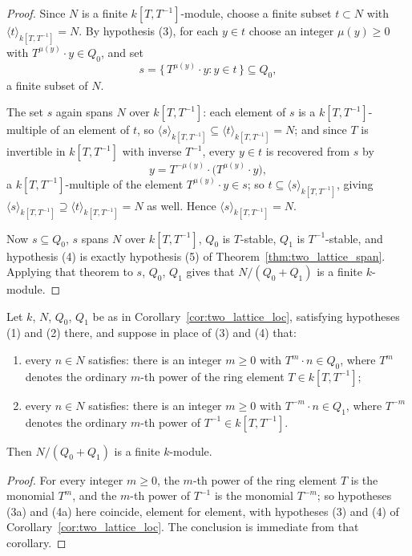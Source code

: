 \begin{proof}
  \leanok
  Since \(N\) is a finite \(k[T,T^{-1}]\)-module, choose a finite subset \(t \subset N\) with
  \(\langle t \rangle_{k[T,T^{-1}]} = N\). By hypothesis (3), for each \(y \in t\) choose an
  integer \(\mu(y) \ge 0\) with \(T^{\mu(y)} \cdot y \in Q_0\), and set
  \[
    s = \{\, T^{\mu(y)} \cdot y : y \in t \,\} \subseteq Q_0 ,
  \]
  a finite subset of \(N\).

  The set \(s\) again spans \(N\) over \(k[T,T^{-1}]\): each element of \(s\) is a
  \(k[T,T^{-1}]\)-multiple of an element of \(t\), so
  \(\langle s \rangle_{k[T,T^{-1}]} \subseteq \langle t \rangle_{k[T,T^{-1}]} = N\); and since
  \(T\) is invertible in \(k[T,T^{-1}]\) with inverse \(T^{-1}\), every \(y \in t\) is
  recovered from \(s\) by
  \[
    y = T^{-\mu(y)} \cdot \bigl(T^{\mu(y)} \cdot y\bigr) ,
  \]
  a \(k[T,T^{-1}]\)-multiple of the element \(T^{\mu(y)} \cdot y \in s\); so
  \(t \subseteq \langle s \rangle_{k[T,T^{-1}]}\), giving
  \(\langle s \rangle_{k[T,T^{-1}]} \supseteq \langle t \rangle_{k[T,T^{-1}]} = N\) as well.
  Hence \(\langle s \rangle_{k[T,T^{-1}]} = N\).

  Now \(s \subseteq Q_0\), \(s\) spans \(N\) over \(k[T,T^{-1}]\), \(Q_0\) is \(T\)-stable,
  \(Q_1\) is \(T^{-1}\)-stable, and hypothesis (4) is exactly hypothesis (5) of
  Theorem~\ref{thm:two_lattice_span}. Applying that theorem to \(s\), \(Q_0\), \(Q_1\) gives
  that \(N/(Q_0+Q_1)\) is a finite \(k\)-module.
\end{proof}

\begin{corollary}
  \label{cor:two_lattice_loc_pow}
  \leanok
  Let \(k\), \(N\), \(Q_0\), \(Q_1\) be as in Corollary~\ref{cor:two_lattice_loc}, satisfying
  hypotheses (1) and (2) there, and suppose in place of (3) and (4) that:
  \begin{enumerate}
    \item[(3a)] every \(n \in N\) satisfies: there is an integer \(m \ge 0\) with
      \(T^m \cdot n \in Q_0\), where \(T^m\) denotes the ordinary \(m\)-th power of the ring
      element \(T \in k[T,T^{-1}]\);
    \item[(4a)] every \(n \in N\) satisfies: there is an integer \(m \ge 0\) with
      \(T^{-m} \cdot n \in Q_1\), where \(T^{-m}\) denotes the ordinary \(m\)-th power of
      \(T^{-1} \in k[T,T^{-1}]\).
  \end{enumerate}
  Then \(N / (Q_0 + Q_1)\) is a finite \(k\)-module.
\end{corollary}
\begin{proof}
  \leanok
  For every integer \(m \ge 0\), the \(m\)-th power of the ring element \(T\) is the monomial
  \(T^m\), and the \(m\)-th power of \(T^{-1}\) is the monomial \(T^{-m}\); so hypotheses
  (3a) and (4a) here coincide, element for element, with hypotheses (3) and (4) of
  Corollary~\ref{cor:two_lattice_loc}. The conclusion is immediate from that corollary.
\end{proof}

